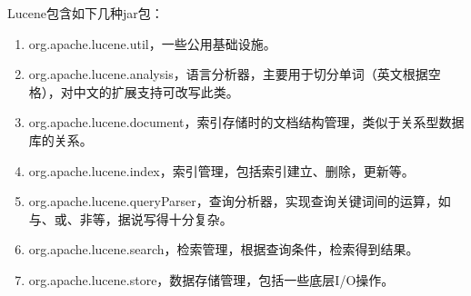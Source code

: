 \par Lucene包含如下几种jar包：
\begin{enumerate}[(1)]
\item org.apache.lucene.util，一些公用基础设施。
\item org.apache.lucene.analysis，语言分析器，主要用于切分单词（英文根据空格），对中文的扩展支持可改写此类。
\item org.apache.lucene.document，索引存储时的文档结构管理，类似于关系型数据库的关系。
\item org.apache.lucene.index，索引管理，包括索引建立、删除，更新等。
\item org.apache.lucene.queryParser，查询分析器，实现查询关键词间的运算，如与、或、非等，据说写得十分复杂。
\item org.apache.lucene.search，检索管理，根据查询条件，检索得到结果。
\item org.apache.lucene.store，数据存储管理，包括一些底层I/O操作。
\end{enumerate}
